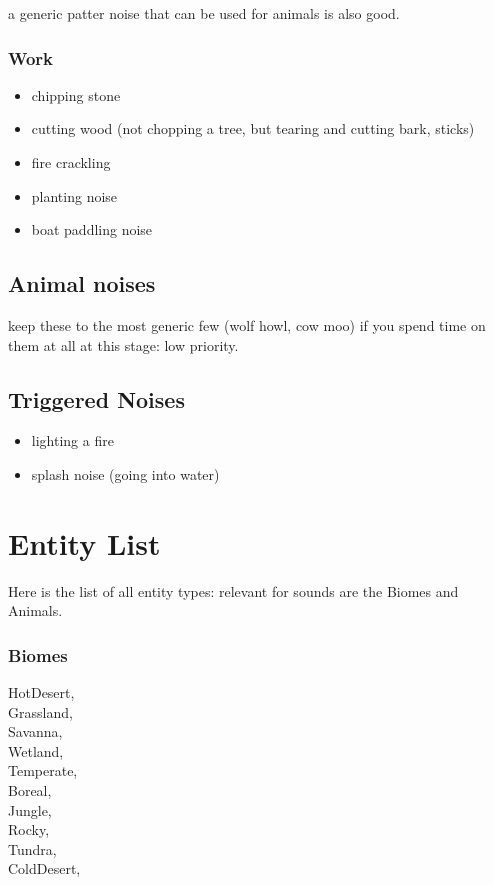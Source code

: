 \documentclass[11pt]{article}
\begin{document}
a generic patter noise that can be used for animals is also good.\\
\subsubsection{Work}
\label{sec:org17e4453}
\begin{itemize}
\item[{$\square$}] chipping stone\\
\item[{$\square$}] cutting wood (not chopping a tree, but tearing and cutting bark, sticks)\\
\item[{$\square$}] fire crackling\\
\item[{$\square$}] planting noise\\
\item[{$\square$}] boat paddling noise\\
\end{itemize}
\subsection{Animal noises}
\label{sec:org236267b}
keep these to the most generic few (wolf howl, cow moo) if you spend time on them at all at this stage: low priority.\\
\subsection{Triggered Noises}
\label{sec:orgee7999f}
\begin{itemize}
\item[{$\square$}] lighting a fire\\
\item[{$\square$}] splash noise (going into water)\\
\end{itemize}
\section{Entity List}
\label{sec:org1bfe102}
Here is the list of all entity types: relevant for sounds are the Biomes and Animals.\\
\subsubsection{Biomes}
\label{sec:org39cf3a8}
HotDesert,\\
Grassland,\\
Savanna,\\
Wetland,\\
Temperate,\\
Boreal,\\
Jungle,\\
Rocky,\\
Tundra,\\
ColdDesert,\\
\end{document}
